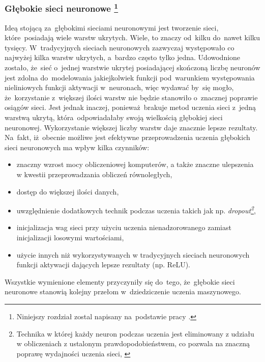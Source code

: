 \subsubsection[Głębokie sieci neuronowe]{Głębokie sieci neuronowe \footnote{Niniejszy rozdział zostal napisany na~podstawie pracy \cite{dnn1}. }}\label{dnn}
Ideą stojącą za~głębokimi sieciami neuronowymi jest tworzenie sieci, które~posiadają wiele warstw ukrytych. Wiele, to znaczy od~kilku do~nawet kilku tysięcy. W~tradycyjnych sieciach neuronowych zazwyczaj występowało co najwyżej kilka warstw ukrytych, a~bardzo często tylko jedna. Udowodnione zostało, że~sieć o~jednej warstwie ukrytej posiadającej skończoną liczbę neuronów jest zdolna do~modelowania jakiejkolwiek funkcji pod~warunkiem występowania nieliniowych funkcji aktywacji w~neuronach\cite{anntheorem}, więc wydawać by~się mogło, że~korzystanie z~większej ilości warstw nie będzie stanowiło o~znacznej poprawie osiągów sieci. Jest jednak inaczej, ponieważ~brakuje metod uczenia sieci z~jedną warstwą ukrytą, która~odpowiadałaby swoją wielkością głębokiej sieci neuronowej. Wykorzystanie większej liczby warstw daje znacznie lepsze rezultaty. Na~fakt, iż~obecnie możliwe jest efektywne przeprowadzenia uczenia głębokich sieci neuronowych ma wpływ kilka czynników:
\begin{itemize}
\item znaczny wzrost mocy obliczeniowej komputerów, a także znaczne ulepszenia w kwestii przeprowadzania obliczeń równoległych,
\item dostęp do większej ilości danych,
\item uwzględnienie dodatkowych technik podczas uczenia takich jak np. \textit{dropout\footnote{Technika w której każdy neuron podczas uczenia jest eliminowany z udziału w obliczeniach z ustalonym prawdopodobieństwem, co pozwala na znaczną poprawę wydajności uczenia sieci, \cite{srivastava2014dropout}}},
\item inicjalizacja wag sieci przy użyciu uczenia nienadzorowanego zamiast inicjalizacji losowymi wartościami,
\item użycie innych niż wykorzystywanych w tradycyjnych sieciach neuronowych funkcji aktywacji dających lepsze rezultaty (np. ReLU).
\end{itemize}
Wszystkie wymienione elementy przyczyniły się do~tego, że~głębokie sieci neuronowe stanowią kolejny przełom w~dziedziczenie uczenia maszynowego.

